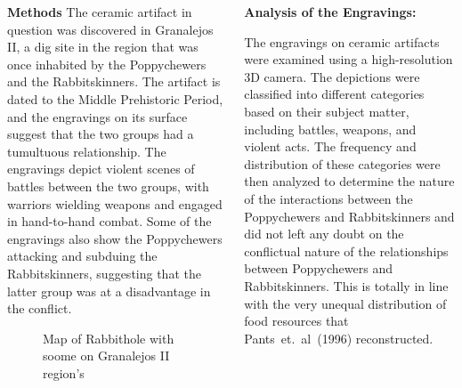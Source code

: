 \documentclass[final]{beamer}
\begin{document}
\begin{frame}[t]
\begin{columns}[t]
    \begin{block}{\textbf{Methods}}
        The ceramic artifact in question was discovered in Granalejos II, a dig site in the region that was once inhabited by the Poppychewers and the Rabbitskinners. The artifact is dated to the Middle Prehistoric Period, and the engravings on its surface suggest that the two groups had a tumultuous relationship. The engravings depict violent scenes of battles between the two groups, with warriors wielding weapons and engaged in hand-to-hand combat. Some of the engravings also show the Poppychewers attacking and subduing the Rabbitskinners, suggesting that the latter group was at a disadvantage in the conflict.

            \begin{figure}
                \label{fig:granalejos}
                \centering
                \caption{Map of Rabbithole with soome on Granalejos II region's}
            \end{figure}
        \end{block}

        \begin{block}{\textbf{Analysis of the Engravings:}}
            

            The engravings on ceramic artifacts were examined using a high-resolution 3D camera. The depictions were classified into different categories based on their subject matter, including battles, weapons, and violent acts. The frequency and distribution of these categories were then analyzed to determine the nature of the interactions between the Poppychewers and Rabbitskinners and did not left any doubt on the conflictual nature of the relationships between Poppychewers and Rabbitskinners. This is totally in line with the very unequal distribution of food resources that Pants~et.~al~(1996) reconstructed.


\end{block}
\end{columns}
\end{frame}
\end{document}
